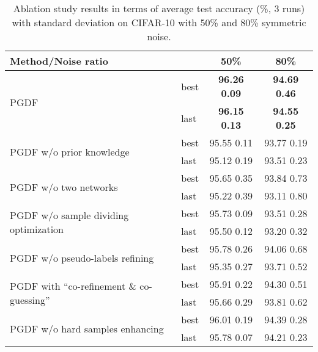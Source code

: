 \documentclass[letterpaper]{article} \usepackage{aaai22}  \usepackage{times}  \usepackage{helvet}  \usepackage{courier}  \usepackage[hyphens]{url}  \usepackage{graphicx} \urlstyle{rm} \def\UrlFont{\rm}  \usepackage{natbib}  \usepackage{caption} \DeclareCaptionStyle{ruled}{labelfont=normalfont,labelsep=colon,strut=off} \frenchspacing  \setlength{\pdfpagewidth}{8.5in}  \setlength{\pdfpageheight}{11in}  \usepackage{algorithm}
\begin{document}
\begin{table}[]
\caption{Ablation study results in terms of average test accuracy (\%, 3 runs) with standard deviation on CIFAR-10 with 50\% and 80\% symmetric noise.}
\vskip 0.15in
\scriptsize
\centering
\begin{tabular}{@{}ll|c|c@{}}
\toprule
Method/Noise ratio                                &      & 50\%          & 80\%          \\ \midrule
\multirow{2}{*}{PGDF}                             & best & \textbf{96.26    0.09} & \textbf{94.69    0.46} \\
                                                  & last & \textbf{96.15    0.13} & \textbf{94.55    0.25} \\ \midrule
\multirow{2}{*}{PGDF w/o prior knowledge}         & best & 95.55    0.11          & 93.77    0.19          \\
                                                  & last & 95.12    0.19          & 93.51    0.23          \\ \midrule
\multirow{2}{*}{PGDF w/o two networks}         & best & 95.65    0.35          & 93.84    0.73          \\
                                                  & last & 95.22    0.39          & 93.11    0.80     \\ \midrule
\multirow{2}{*}{PGDF w/o sample dividing optimization} & best & 95.73    0.09          & 93.51    0.28         \\
                                                  & last & 95.50    0.12          & 93.20    0.32          \\ \midrule
\multirow{2}{*}{PGDF w/o pseudo-labels refining} & best & 95.78    0.26          & 94.06    0.68         \\
                                                  & last & 95.35    0.27          & 93.71    0.52          \\ \midrule
\multirow{2}{*}{PGDF with ``co-refinement \& co-guessing''} & best & 95.91    0.22          & 94.30    0.51         \\
                                                  & last & 95.66    0.29          & 93.81    0.62          \\ \midrule
\multirow{2}{*}{PGDF w/o hard samples enhancing}          & best & 96.01    0.19          & 94.39    0.28          \\
                                                  & last & 95.78    0.07          & 94.21    0.23           \\ \bottomrule
\end{tabular}
\label{ablation}
\vskip -0.1in
\end{table}
\end{document}

